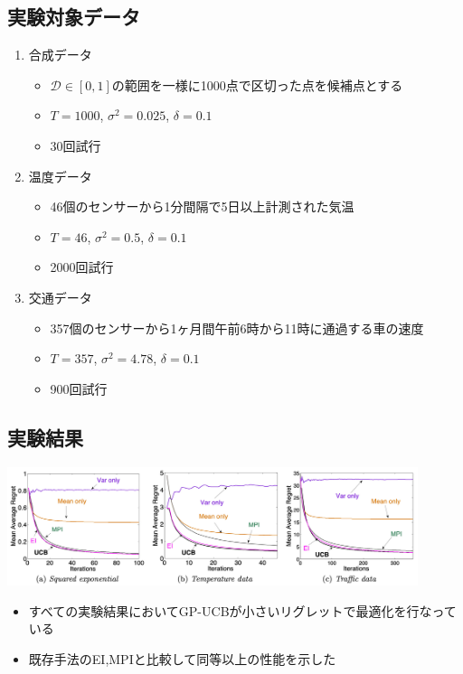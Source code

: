 \documentclass[dvipdfmx, 10.5pt]{beamer}
\begin{document}
\subsection{実験対象データ}
\begin{frame}{\insertsubsection}
	\begin{enumerate}
		\item 合成データ
		\begin{itemize}
			\item $\mathcal{D} \in [0,1]$の範囲を一様に1000点で区切った点を候補点とする
			\item $T = 1000$, $\sigma^2 = 0.025$, $\delta = 0.1$
			\item 30回試行
		\end{itemize}
		\vspace{5pt}
		\item 温度データ
		\begin{itemize}
			\item 46個のセンサーから1分間隔で5日以上計測された気温
			\item $T = 46$, $\sigma^2 = 0.5$, $\delta = 0.1$
			\item 2000回試行
		\end{itemize}
		\vspace{5pt}
		\item 交通データ
		\begin{itemize}
			\item 357個のセンサーから1ヶ月間午前6時から11時に通過する車の速度
			\item $T = 357$, $\sigma^2 = 4.78$, $\delta = 0.1$
			\item 900回試行
		\end{itemize}
	\end{enumerate}
\end{frame}


\subsection{実験結果}

\begin{frame}{\insertsubsection}
	\begin{center}
		\includegraphics[width=0.90\textwidth]{./Fig/Figure4.pdf}
	\end{center}
	\begin{itemize}
		\item すべての実験結果においてGP-UCBが小さいリグレットで最適化を行なっている
		\item \textcolor{myorange}{既存手法のEI,MPIと比較して同等以上の性能を示した}
	\end{itemize}

\end{frame}
\end{document}
